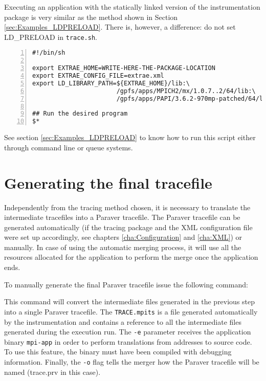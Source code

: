 Executing an application with the statically linked version of the instrumentation package is very similar as the method shown in Section \ref{sec:Examples_LDPRELOAD}. There is, however, a difference: do not set LD\_PRELOAD in {\tt trace.sh}.

\begin{Verbatim}[frame=single,numbers=left,labelposition=topline,label=trace.sh]
#!/bin/sh

export EXTRAE_HOME=WRITE-HERE-THE-PACKAGE-LOCATION
export EXTRAE_CONFIG_FILE=extrae.xml
export LD_LIBRARY_PATH=${EXTRAE_HOME}/lib:\
                       /gpfs/apps/MPICH2/mx/1.0.7..2/64/lib:\
                       /gpfs/apps/PAPI/3.6.2-970mp-patched/64/lib

## Run the desired program
$*
\end{Verbatim}

See section \ref{sec:Examples_LDPRELOAD} to know how to run this script either through command line or queue systems.

\section{Generating the final tracefile}\label{subsec:Examples_LDPRELOAD_Final}

Independently from the tracing method chosen, it is necessary to translate the intermediate tracefiles into a Paraver tracefile. The Paraver tracefile can be generated automatically (if the tracing package and the XML configuration file were set up accordingly, see chapters \ref{cha:Configuration} and \ref{cha:XML}) or manually. In case of using the automatic merging process, it will use all the resources allocated for the application to perform the merge once the application ends.

To manually generate the final Paraver tracefile issue the following command:


This command will convert the intermediate files generated in the previous step into a single Paraver tracefile. The {\tt TRACE.mpits} is a file generated automatically by the instrumentation and contains a reference to all the intermediate files generated during the execution run. The {\tt -e} parameter receives the application binary {\tt mpi-app} in order to perform translations from addresses to source code. To use this feature, the binary must have been compiled with debugging information. Finally, the {\tt -o} flag tells the merger how the Paraver tracefile will be named (trace.prv in this case).

